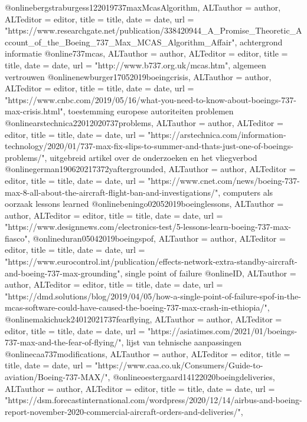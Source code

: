 {{{{{{{{{{{{{{@online{bergstraburgess122019737maxMcasAlgorithm,	ALTauthor = {author},	ALTeditor = {editor},	title = {title},	date = {date},	url = {"https://www.researchgate.net/publication/338420944_A_Promise_Theoretic_Account_of_the_Boeing_737_Max_MCAS_Algorithm_Affair"},}
achtergrond informatie
@online{737mcas,	ALTauthor = {author},	ALTeditor = {editor},	title = {title},	date = {date},	url = {"http://www.b737.org.uk/mcas.htm"},}
algemeen vertrouwen
@online{newburger17052019boeingcrisis,	ALTauthor = {author},	ALTeditor = {editor},	title = {title},	date = {date},	url = {"https://www.cnbc.com/2019/05/16/what-you-need-to-know-about-boeings-737-max-crisis.html"},}
toestemming europese autoriteiten
problemen
@online{arstechnica22012020737problems,	ALTauthor = {author},	ALTeditor = {editor},	title = {title},	date = {date},	url = {"https://arstechnica.com/information-technology/2020/01/737-max-fix-slips-to-summer-and-thats-just-one-of-boeings-problems/"},}
uitgebreid artikel over de onderzoeken en het vliegverbod
@online{german190620217372yaftergrounded,	ALTauthor = {author},	ALTeditor = {editor},	title = {title},	date = {date},	url = {"https://www.cnet.com/news/boeing-737-max-8-all-about-the-aircraft-flight-ban-and-investigations/"},}
computers als oorzaak
lessons learned
@online{beningo02052019boeinglessons,	ALTauthor = {author},	ALTeditor = {editor},	title = {title},	date = {date},	url = {"https://www.designnews.com/electronics-test/5-lessons-learn-boeing-737-max-fiasco"},}
@online{duran05042019boeingspof,	ALTauthor = {author},	ALTeditor = {editor},	title = {title},	date = {date},	url = {"https://www.eurocontrol.int/publication/effects-network-extra-standby-aircraft-and-boeing-737-max-grounding"},}
single point of failure
@online{ID,	ALTauthor = {author},	ALTeditor = {editor},	title = {title},	date = {date},	url = {"https://dmd.solutions/blog/2019/04/05/how-a-single-point-of-failure-spof-in-the-mcas-software-could-have-caused-the-boeing-737-max-crash-in-ethiopia/"},}
@online{makichuck24012021737fearflying,	ALTauthor = {author},	ALTeditor = {editor},	title = {title},	date = {date},	url = {"https://asiatimes.com/2021/01/boeings-737-max-and-the-fear-of-flying/"},}
lijst van tehnische aanpassingen
@online{caa737modifications,	ALTauthor = {author},	ALTeditor = {editor},	title = {title},	date = {date},	url = {"https://www.caa.co.uk/Consumers/Guide-to-aviation/Boeing-737-MAX/"},}
@online{oestergaard14122020boeingdeliveries,	ALTauthor = {author},	ALTeditor = {editor},	title = {title},	date = {date},	url = {"https://dsm.forecastinternational.com/wordpress/2020/12/14/airbus-and-boeing-report-november-2020-commercial-aircraft-orders-and-deliveries/"},}
}}}}}}}}}}}}}}
